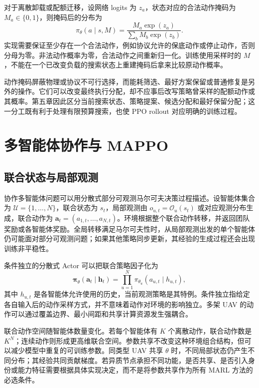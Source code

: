 对于离散卸载或配额迁移，设网络 logits 为 $z_a$，状态对应的合法动作掩码为 $M_a\in\{0,1\}$，则掩码后的分布为
\begin{equation}
    \pi_\theta(a\mid s,M)
    =\frac{M_a\exp(z_a)}{\sum_b M_b\exp(z_b)}.
    \label{eq:ch2-masked-policy}
\end{equation}
实现需要保证至少存在一个合法动作，例如协议允许的保底动作或停止动作，否则分母为零。非法动作概率为零，合法动作之间重新归一化。训练使用采样时的 $M$，不能在一个已改变负载的搜索状态上重建掩码后拿来比较原动作概率。

动作掩码屏蔽物理或协议不可行选择，而能耗筛选、最好方案保留或普通修复是另外的操作。它们可以改变最终执行分配，却不应事后改写策略曾采样的配额动作或其概率。第五章因此区分当前搜索状态、策略提案、候选分配和最好保留分配；这一分工既有利于处理有限预算搜索，也使 PPO rollout 对应明确的训练过程。

\section{多智能体协作与 MAPPO}
\label{sec:marl-technology}

\subsection{联合状态与局部观测}
\label{subsec:marl}

协作多智能体问题可以用分散式部分可观测马尔可夫决策过程描述。设智能体集合为 $\mathcal U=\{1,\ldots,N\}$，联合状态为 $s_t$，局部观测由 $o_{u,t}=\mathcal O_u(s_t)$ 或对应观测分布生成，联合动作为 $\boldsymbol a_t=(a_{1,t},\ldots,a_{N,t})$。环境根据整个联合动作转移，并返回团队奖励或各智能体奖励。全局转移满足马尔可夫性时，从局部观测出发的单个智能体仍可能面对部分可观测问题；如果其他策略同步更新，其经验的生成过程还会出现训练非平稳性\cite{gronauer2022multi}。

条件独立的分散式 Actor 可以把联合策略因子化为
\begin{equation}
    \boldsymbol\pi_\theta(\boldsymbol a_t\mid\boldsymbol h_t)
    =\prod_{u=1}^{N}\pi_{\theta_u}(a_{u,t}\mid h_{u,t}),
    \label{eq:ch2-factorized-policy}
\end{equation}
其中 $h_{u,t}$ 是各智能体允许使用的历史，当前观测策略是其特例。条件独立指给定各自输入后的动作采样方式，并不意味着动作对环境的影响独立。多架 UAV 的动作可以通过覆盖边界、最小间距和共享计算资源发生强耦合。

联合动作空间随智能体数量变化。若每个智能体有 $K$ 个离散动作，联合动作数是 $K^N$；连续动作则形成更高维联合空间。参数共享不改变这种环境组合结构，但可以减少模型中重复的可训练参数。同类型 UAV 共享 $\theta$ 时，不同局部状态仍产生不同分布；其经验共同贡献梯度。若异质节点承担不同功能，是否共享、是否引入身份或能力特征需要根据具体实现决定，而不是将参数共享作为所有 MARL 方法的必选条件。

